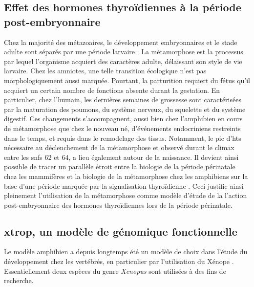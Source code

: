 \documentclass[../main.tex]{subfiles}
\begin{document}

\subsection{Effet des hormones thyroïdiennes à la période post-embryonnaire}
Chez la majorité des métazoaires, le développement embryonnaires et le stade adulte sont séparés par une période larvaire \citep{Laudet2011b,Holstein2014}.
La métamorphose est la processus par lequel l'organisme acquiert des caractères adulte, délaissant son style de vie larvaire.
Chez les amniotes, une telle transition écologique n'est pas morphologiquement aussi marquée.
Pourtant, la parturition requiert du fétus qu'il acquiert un certain nombre de fonctions absente durant la gestation.
En particulier, chez l'humain, les dernières semaines de grossesse sont caractérisées par la maturation des poumons, du système nerveux, du squelette et du système digestif.
Ces changements s'accompagnent, aussi bien chez l'amphibien en cours de métamorphose que chez le nouveau né, d'événements endocriniens restreints dans le temps, et requis dans le remodelage des tissus.
Notamment, le pic d'\glspl{ht} nécessaire au déclenchement de la métamorphose et observé durant le climax entre les \glspl{snf} 62 et 64, a lieu également autour de la naissance.
Il devient ainsi possible de tracer un parallèle étroit entre la biologie de la période périnatale chez les mammifères et la biologie de la métamorphose chez les amphibiens sur la base d'une période marquée par la signalisation thyroïdienne \citep{Laudet2011b}.
Ceci justifie ainsi pleinement l'utilisation de la métamorphose comme modèle d'étude de la l'action post-embryonnaire des hormones thyroïdiennes lors de la période périnatale. 


\subsection{\gls{xtrop}, un modèle de génomique fonctionnelle}\label{subsec:xtrop-model}
Le modèle amphibien a depuis longtemps été un modèle de choix dans l'étude du développement chez les vertébrés, en particulier par l'utilisation du Xénope \citep{Harland2011}.
Essentiellement deux espèces du genre \textit{Xenopus} sont utilisées à des fins de recherche.
\end{document}

